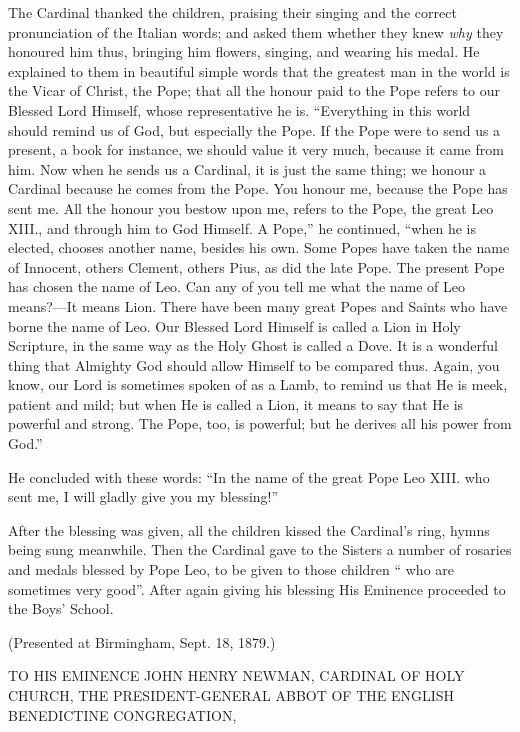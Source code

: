 The Cardinal thanked the children, praising their
singing and the correct pronunciation of the Italian words; and asked
them whether they knew \emph{why} they honoured him thus, bringing him
flowers, singing, and wearing his medal. He explained to them in
beautiful simple words that the greatest man in the world is the Vicar
of Christ, the Pope; that all the honour paid to the Pope refers to
our Blessed Lord Himself, whose representative he is. ``Everything
in this world should remind us of God, but especially the Pope. If the
Pope were to send us a present, a book for instance, we should value
it very much, because it came from him. Now when he sends us a
Cardinal, it is just the same thing; we honour a Cardinal because he
comes from the Pope. You honour me, because the Pope has sent me. All
the honour you bestow upon me, refers to the Pope, the great Leo
XIII., and through him to God Himself. A Pope,'' he continued,
``when he is elected, chooses another name, besides his own. Some
Popes have taken the name of Innocent, others Clement, others Pius, as
did the late Pope. The present Pope has chosen the name of Leo. Can
any of you tell me what the name of Leo means?—It means Lion. There
have been many great Popes and Saints who have borne the name of Leo.
Our Blessed Lord Himself is called a Lion in Holy Scripture, in the
same way as the Holy Ghost is called a
Dove. It is a wonderful thing that Almighty God should allow Himself
to be compared thus. Again, you know, our Lord is sometimes spoken of
as a Lamb, to remind us that He is meek, patient and mild; but when He
is called a Lion, it means to say that He is powerful and strong. The
Pope, too, is powerful; but he derives all his power from God.''

He concluded with these words: ``In the name of the great Pope
Leo XIII. who sent me, I will gladly give you my blessing!''

After the blessing was given, all the children kissed the Cardinal's
ring, hymns being sung meanwhile. Then the Cardinal gave to the
Sisters a number of rosaries and medals blessed by Pope Leo, to be
given to those children `` who are sometimes very good''.
After again giving his blessing His Eminence proceeded to the Boys'
School.


(Presented at Birmingham, Sept. 18, 1879.)

TO HIS EMINENCE
JOHN HENRY NEWMAN,
CARDINAL OF HOLY
CHURCH, THE PRESIDENT-GENERAL
ABBOT OF THE
ENGLISH BENEDICTINE CONGREGATION,

